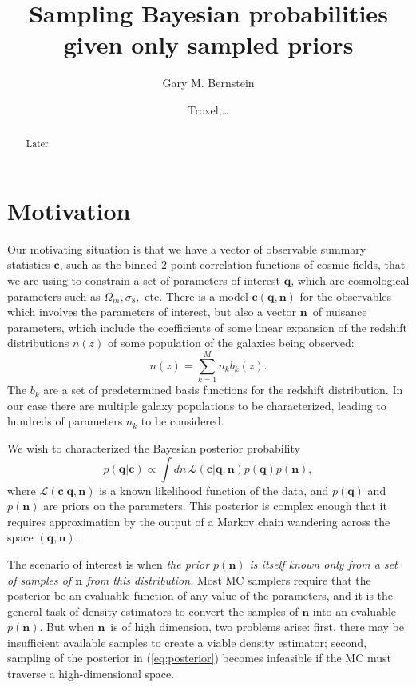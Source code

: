 \documentclass[linenumbers, onecolumn]{aastex63}
\newcommand{\vecc}{\ensuremath{\mathbf{c}}}
\newcommand{\vecq}{\ensuremath{\mathbf{q}}}
\newcommand{\vecn}{\ensuremath{\mathbf{n}}}
\newcommand{\likeli}{\mathcal{L}}
\begin{document}
\title{Sampling Bayesian probabilities given only sampled priors}

\author[0000-0002-8613-8259]{Gary M. Bernstein}

\author{Troxel,\ldots}

\begin{abstract}
	\vspace{0.2in}
Later.
\end{abstract}
\reportnum{}

\section{Motivation} \label{sec:intro}

Our motivating situation is that we have a vector of observable summary statistics \vecc, such as the binned 2-point correlation functions of cosmic fields, that we are using to constrain a set of parameters of interest \vecq, which are cosmological parameters such as $\Omega_m, \sigma_8,$ etc.  There is a model $\vecc(\vecq,\vecn)$ for the observables which involves the parameters of interest, but also a vector \vecn\ of nuisance parameters, which include the coefficients of some linear expansion of the redshift distributions $n(z)$ of some population of the galaxies being observed:
\begin{equation}
  n(z) = \sum_{k=1}^{M} n_k b_k(z).
  \label{eq:nzbasis}
\end{equation}
The $b_k$ are a set of predetermined basis functions for the redshift distribution.  In our case there are multiple galaxy populations to be characterized, leading to hundreds of parameters $n_k$ to be considered.

We wish to characterized the Bayesian posterior probability
\begin{equation}
  p(\vecq | \vecc) \propto \int dn\, \likeli(\vecc | \vecq, \vecn) p(\vecq) p(\vecn),
\label{eq:posterior}
\end{equation}
where $\likeli(\vecc | \vecq, \vecn)$ is a known likelihood function of the data, and $p(\vecq)$ and $p(\vecn)$ are priors on the parameters.  This posterior is complex enough that it requires approximation by the output of a Markov chain wandering across the space $(\vecq,\vecn).$

The scenario of interest is when \emph{the prior $p(\vecn)$ is itself known only from a set of samples of $\vecn$ from this distribution.} Most MC samplers require that the posterior be an evaluable function of any value of the parameters, and it is the general task of density estimators to convert the samples of $\vecn$ into an evaluable $p(\vecn).$  But when \vecn\ is of high dimension, two problems arise: first, there may be insufficient available samples to create a viable density estimator; second, sampling of the posterior in (\ref{eq:posterior}) becomes infeasible if the MC must traverse a high-dimensional space.
\end{document}
